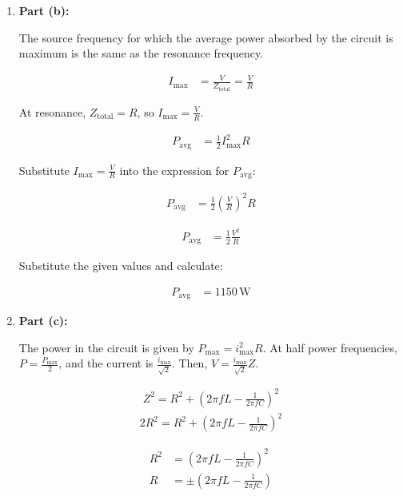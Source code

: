 \documentclass[journal,12pt,twocolumn]{IEEEtran}
\theoremstyle{remark}
\begin{document}
\begin{enumerate}
    \item \textbf{Part (b):}

    The source frequency for which the average power absorbed by the circuit is maximum is the same as the resonance frequency.

    \begin{align}
        I_{\text{max}} &= \frac{V}{Z_{\text{total}}} = \frac{V}{R}
    \end{align}

    At resonance, \(Z_{\text{total}} = R\), so \(I_{\text{max}} = \frac{V}{R}\).

    \begin{align}
        P_{\text{avg}} &= \frac{1}{2} I_{\text{max}}^2 R
    \end{align}

    Substitute \(I_{\text{max}} = \frac{V}{R}\) into the expression for \(P_{\text{avg}}\):

    \begin{align}
        P_{\text{avg}} &= \frac{1}{2} \left(\frac{V}{R}\right)^2 R
    \end{align}

    \begin{align}
        P_{\text{avg}} &= \frac{1}{2} \frac{V^2}{R} 
    \end{align}

    Substitute the given values and calculate:

    \begin{align}
        P_{\text{avg}} &= 1150 \, \text{W}
    \end{align}

    \item \textbf{Part (c):}

    The power in the circuit is given by \(P_{\text{max}} = i_{\text{max}}^2 R\). At half power frequencies, \(P = \frac{P_{\text{max}}}{2}\), and the current is \(\frac{i_{\text{max}}}{\sqrt{2}}\). Then, \(V = \frac{i_{\text{max}}}{\sqrt{2}} Z\).

\begin{align}
Z^2 = R^2 + \left(2\pi f L - \frac{1}{2\pi f C}\right)^2
\end{align}
\begin{align}
2R^2=  R^2 + \left(2\pi f L - \frac{1}{2\pi f C}\right)^2
\end{align}

    \begin{align}
        R^2 &= \left(2\pi f L - \frac{1}{2\pi f C}\right)^2 \\
        R &= \pm \left(2\pi f L - \frac{1}{2\pi f C}\right)
    \end{align}


\end{enumerate}
\end{document}
